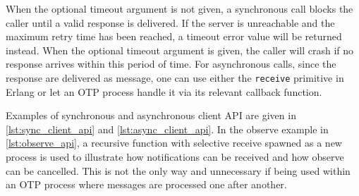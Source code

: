 When the optional timeout argument is not given, a synchronous call blocks the caller until a valid response is delivered. If the server is unreachable and the maximum retry time has been reached, a timeout error value will be returned instead. When the optional timeout argument is given, the caller will crash if no response arrives within this period of time. For asynchronous calls, since the response are delivered as message, one can use either the \verb|receive| primitive in Erlang or let an OTP process handle it via its relevant callback function. 

Examples of synchronous and asynchronous client API are given in \autoref{lst:sync_client_api} and \autoref{lst:async_client_api}. In the observe example in \autoref{lst:observe_api}, a recursive function with selective receive spawned as a new process is used to illustrate how notifications can be received and how observe can be cancelled. This is not the only way and unnecessary if being used within an OTP process where messages are processed one after another.


